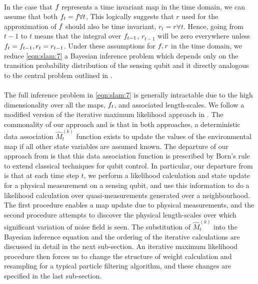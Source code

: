   \\
  In the case that $f_{ }$ represents a time invariant map in the time domain, we can assume that both $f_{ t} = f_{ } \forall t$, This logically suggests that $r$ used for the approximation of $f_{ }$ should also be time invariant, $r_t = r \forall t$. Hence, going from $t-1$ to $t$ means that the integral over $f_{ t-1}$, $r_{t-1}$ will be zero everywhere unless $f_{ t}=f_{ t-1}, r_t = r_{t-1}$. Under these assumptions for $f_{ }, r$ in the time domain, we reduce \cref{eqn:slam:7} a Bayesian inference problem which depends only on the transition probability distribution of the sensing qubit and it directly analogous to the central problem outlined in \cite{thrun2001probabilistic}.\\
  \\
  The full inference problem in \cref{eqn:slam:7} is generally intractable due to the high dimensionality over all the maps, $f_{ t}$, and associated length-scales. We follow a modified version of the iterative maximum likelihood approach in \cite{thrun2001probabilistic}. The commonality of our approach and \cite{thrun2001probabilistic} is that in both approaches, a deterministic data association $\hat{M}_t^{(k)}$ function exists to update the values of the environmental map if all other state variables are assumed known. The departure of our approach from \cite{thrun2001probabilistic} is that this data association function is prescribed by Born's rule to extend classical techniques for qubit control. In particular, our departure from \cite{thrun2001probabilistic} is that at each time step $t$,  we perform a likelihood calculation and state update for a physical measurement on a sensing qubit, and use this information to do a likelihood calculation over quasi-measurements generated over a neighbourhood. The first procedure enables a map update due to physical measurements, and the second procedure attempts to discover the physical length-scales over which significant variation of noise field is seen.  The substitution of $\hat{M}_t^{(k)}$ into the Bayesian inference equation and the ordering of the iterative calculations are discussed in detail in the next sub-section. An iterative maximum likelihood procedure then forces us to change the structure of weight calculation and resampling for a typical particle filtering algorithm, and these changes are specified in the last sub-section. 
  
